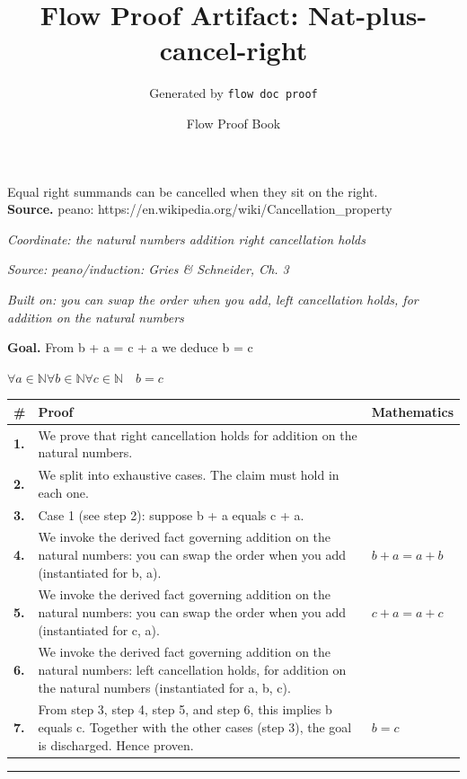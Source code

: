 \documentclass[11pt]{article}
\title{Flow Proof Artifact: Nat-plus-cancel-right}
\author{Generated by \texttt{flow doc proof}}
\date{Flow Proof Book}
\theoremstyle{definition}
\begin{document}
\maketitle
Equal right summands can be cancelled when they sit on the right.\\[0.5em]
\textbf{Source.} peano: https://en.wikipedia.org/wiki/Cancellation\_property\\[0.5em]
\bigskip
{}\par
\smallskip\noindent\textit{Coordinate: the natural numbers \cdot addition \cdot right cancellation holds}\par
\smallskip\noindent\textit{Source: peano/induction: Gries \& Schneider, Ch. 3}\par
\smallskip\noindent\textit{Built on: you can swap the order when you add, left cancellation holds, for addition on the natural numbers}\par
\medskip
\noindent\textbf{Goal.} From b + a = c + a we deduce b = c\par
\noindent$\displaystyle \forall a \in \mathbb{N} \forall b \in \mathbb{N} \forall c \in \mathbb{N}\quad b = c$\par
\medskip
\noindent
\begin{tabular}{@{} >{\raggedright\arraybackslash}p{} >{\raggedright\arraybackslash}p{} >{\raggedleft\arraybackslash}p{} @{}}
\textbf{\#} & \textbf{Proof} & \textbf{Mathematics} \\
\midrule
\textbf{1.} & We prove that right cancellation holds for addition on the natural numbers. & \\[0.45em]
\textbf{2.} & We split into exhaustive cases. The claim must hold in each one. & \\[0.45em]
\textbf{3.} & Case 1 (see step 2): suppose b + a  equals  c + a. & \\[0.45em]
\textbf{4.} & We invoke the derived fact governing addition on the natural numbers: you can swap the order when you add (instantiated for b, a). & $\displaystyle b + a = a + b$ \\[0.45em]
\textbf{5.} & We invoke the derived fact governing addition on the natural numbers: you can swap the order when you add (instantiated for c, a). & $\displaystyle c + a = a + c$ \\[0.45em]
\textbf{6.} & We invoke the derived fact governing addition on the natural numbers: left cancellation holds, for addition on the natural numbers (instantiated for a, b, c). & \\[0.45em]
\textbf{7.} & From step 3, step 4, step 5, and step 6, this implies b equals c. Together with the other cases (step 3), the goal is discharged. Hence proven. & $\displaystyle b = c$ \\[0.45em]
\bottomrule
\end{tabular}
\label{thm:Nat-addition-right_cancellation_holds}
\par\medskip\hrule
\end{document}
